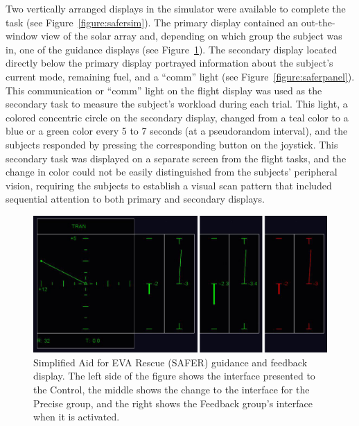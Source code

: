 Two vertically arranged displays in the simulator were available to complete the task (see Figure~\ref{figure:safersim}).
The primary display contained an out-the-window view of the solar array and, depending on which group the subject was in, one of the guidance displays (see Figure~\ref{figure:safergroups}).
The secondary display located directly below the primary display portrayed information about the subject's current mode, remaining fuel, and a ``comm'' light (see Figure~\ref{figure:saferpanel}).
This communication or ``comm'' light on the flight display was used as the secondary task to measure the subject's workload during each trial.
This light, a colored concentric circle on the secondary display, changed from a teal color to a blue or a green color every 5 to 7 seconds (at a pseudorandom interval), and the subjects responded by pressing the corresponding button on the joystick.
This secondary task was displayed on a separate screen from the flight tasks, and the change in color could not be easily distinguished from the subjects' peripheral vision, requiring the subjects to establish a visual scan pattern that included sequential attention to both primary and secondary displays.

\begin{figure}[tb!]
    \begin{center}
        \includegraphics[width=\linewidth]{figures/Introduction/SAFERGroups.png}
        \caption[Simplified Aid for EVA Rescue (SAFER) guidance and feedback display]{Simplified Aid for EVA Rescue (SAFER) guidance and feedback display. The left side of the figure shows the interface presented to the Control, the middle shows the change to the interface for the Precise group, and the right shows the Feedback group's interface when it is activated.}
        \label{figure:safergroups}
    \end{center}
\end{figure}

